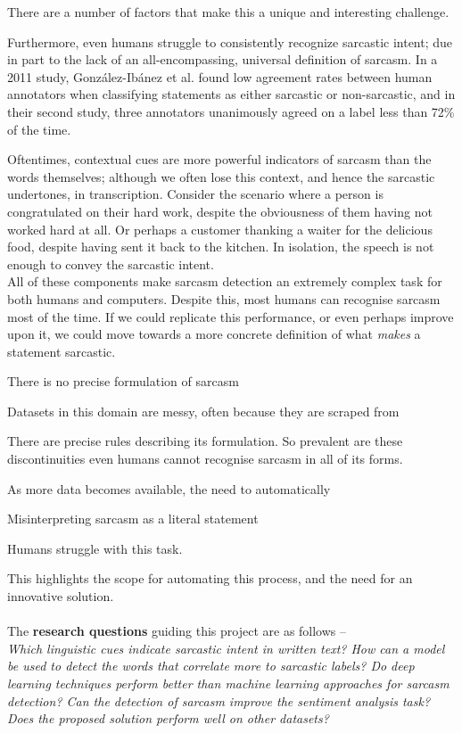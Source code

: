 \documentclass[12pt,a4paper]{article}
\begin{document}
\noindent There are a number of factors that make this a unique and interesting challenge. 

Furthermore, even humans struggle to consistently recognize sarcastic intent; due in part to the lack of an all-encompassing, universal definition of sarcasm. In a 2011 study, Gonz{\'a}lez-Ib{\'a}nez et al. \cite{gonzalez2011identifying} found low agreement rates between human annotators when classifying statements as either sarcastic or non-sarcastic, and in their second study, three annotators unanimously agreed on a label less than 72\% of the time. 




Oftentimes, contextual cues are more powerful indicators of sarcasm than the words themselves; although we often lose this context, and hence the sarcastic undertones, in transcription. Consider the scenario where a person is congratulated on their hard work, despite the obviousness of them having not worked hard at all. Or perhaps a customer thanking a waiter for the delicious food, despite having sent it back to the kitchen. In isolation, the speech is not enough to convey the sarcastic intent. \\



All of these components make sarcasm detection an extremely complex task for both humans and computers. Despite this, most humans can recognise sarcasm most of the time. If we could replicate this performance, or even perhaps improve upon it, we could move towards a more concrete definition of what \textit{makes} a statement sarcastic.

There is no precise formulation of sarcasm

Datasets in this domain are messy, often because they are scraped from

There are precise rules describing its formulation. So prevalent are these discontinuities even humans cannot recognise sarcasm in all of its forms.


As more data becomes available, the need to automatically 

Misinterpreting sarcasm as a literal statement 

Humans struggle with this task. 

This highlights the scope for automating this process, and the need for an innovative solution.\\
\\

\noindent The \textbf{research questions} guiding this project are as follows --
\\ \indent \textit{Which linguistic cues indicate sarcastic intent in written text? How can a model be used to detect the words that correlate more to sarcastic labels? Do deep learning techniques perform better than machine learning approaches for sarcasm detection? Can the detection of sarcasm improve the sentiment analysis task? Does the proposed solution perform well on other datasets?}\\
\end{document}
